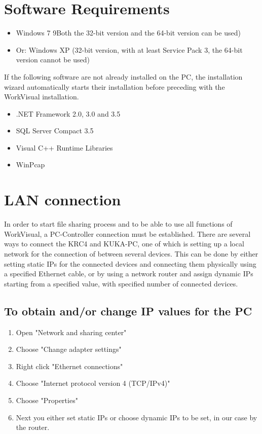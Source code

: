 	\section{Software Requirements}
	\begin{itemize}
		\item Windows 7 9Both the 32-bit version and the 64-bit version can be used)
		\item Or: Windows XP (32-bit version, with at least Service Pack 3, the 64-bit version cannot be used)
	\end{itemize}

	If the following software are not already installed on the PC, the installation wizard automatically starts their installation before preceding with the WorkVisual installation.
	\begin{itemize}
		\item .NET Framework 2.0, 3.0 and 3.5
		\item SQL Server Compact 3.5
		\item Visual C++ Runtime Libraries 
		\item WinPcap 
	\end{itemize}
\section{LAN connection}
In order to start file sharing process and to be able to use all functions of WorkVisual, a PC-Controller connection must be established. There are several ways to connect the KRC4 and KUKA-PC, one of which is setting up a local network for the connection of between several devices. This can be done by either setting static IPs for the connected devices and connecting them physically using a specified Ethernet cable, or by using a network router and assign dynamic IPs starting from a specified value, with specified number of connected devices. 
\subsection{To obtain and/or change IP values for the PC}
\begin{enumerate}
	\item Open "Network and sharing center" 
	\item Choose "Change adapter settings"
	\item Right click "Ethernet connections"
	\item  Choose "Internet protocol version 4 (TCP/IPv4)"
	\item  Choose "Properties"
	\item Next you either set static IPs or choose dynamic IPs to be set, in our case by the router.
\end{enumerate}

